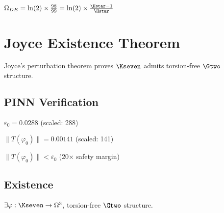 \begin{theorem}\label{thm:Omega_DE_fraction}
    \leanok
    $\Omega_{DE} = \ln(2) \times \frac{98}{99} = \ln(2) \times \frac{\Hstar - 1}{\Hstar}$
\end{theorem}

\chapter{Joyce Existence Theorem}\label{chap:joyce}

Joyce's perturbation theorem proves $\Kseven$ admits torsion-free $\Gtwo$ structure.

\section{PINN Verification}

\begin{definition}\label{def:joyce_epsilon}
    \leanok
    $\varepsilon_0 = 0.0288$ (scaled: 288)
\end{definition}

\begin{definition}\label{def:pinn_torsion}
    \leanok
    $\|T(\varphi_0)\| = 0.00141$ (scaled: 141)
\end{definition}

\begin{theorem}\label{thm:pinn_below}
    \leanok
    $\|T(\varphi_0)\| < \varepsilon_0$ (20$\times$ safety margin)
\end{theorem}

\section{Existence}

\begin{theorem}\label{thm:k7_torsion_free}
    \leanok
    $\exists \varphi : \Kseven \to \Omega^3$, torsion-free $\Gtwo$ structure.
\end{theorem}

